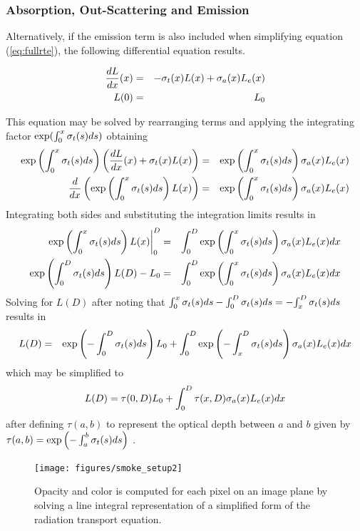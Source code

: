 %
%

\subsubsection{Absorption, Out-Scattering and Emission}
Alternatively, if the emission term is also included when
simplifying equation (\ref{eq:fullrte}),  the following
differential equation results.

\begin{eqnarray}
\label{eq:simple_rte}
\frac{dL}{dx}(x)&=&-\sigma_t(x) L(x) + \sigma_a(x) L_e(x)\\
 L(0)&=&L_0\nonumber
\end{eqnarray}

This equation may be solved by rearranging terms and applying the
integrating factor $\exp(\int_0^x \sigma_t(s) ds)$
obtaining
\begin{eqnarray*}
\exp\left({\int_0^x \sigma_t(s) ds}\right)\left(\frac{dL}{dx}(x)+\sigma_t(x) L(x)\right)&=&  \exp\left({\int_0^x \sigma_t(s) ds}\right)\sigma_a(x) L_e(x)\\
\frac{d}{dx}\left(\exp\left({\int_0^x \sigma_t(s) ds}\right) L(x)\right)&=& \exp\left({\int_0^x \sigma_t(s) ds}\right)\sigma_a(x) L_e(x)
\end{eqnarray*}
Integrating both sides and substituting the integration limits
results in
\begin{eqnarray*}
\left.\exp\left({\int_0^x \sigma_t(s) ds}\right) L(x)\right|_0^D&=& \int_0^D\exp\left({\int_0^x \sigma_t(s) ds}\right)\sigma_a(x) L_e(x) dx \\
\exp\left({\int_0^D \sigma_t(s) ds}\right) L(D)-L_0&=& \int_0^D\exp\left({\int_0^x \sigma_t(s) ds}\right)\sigma_a(x) L_e(x) dx
\end{eqnarray*}
Solving for $L(D)$ after noting that
${\int_0^x \sigma_t(s) ds}-{\int_0^D \sigma_t(s) ds}=-{\int_x^D \sigma_t(s) ds}$ results in
\begin{eqnarray*}
L(D)&=&\exp\left({-\int_0^D \sigma_t(s) ds}\right) L_0+ \int_0^D\exp\left({-\int_x^D \sigma_t(s) ds}\right)\sigma_a(x) L_e(x) dx\\
\end{eqnarray*}
which may be simplified to
\begin{equation}
 L(D)=\tau(0,D)L_0 + \int_0^D\tau(x,D)\sigma_a(x)L_e(x) dx
\end{equation}
after defining $\tau(a,b)$ to represent the optical depth between $a$ and $b$ given
by $\tau(a,b)=\exp\left({-\int_a^b \sigma_t(s) ds}\right)$ .

\begin{figure}[\figoptions]
\begin{center}
\texttt{[image: figures/smoke\_setup2]}
\end{center}
\caption {Opacity and color is computed for each pixel on an image plane by solving a line integral
representation of a simplified form of the radiation transport equation.
}
\label{figsmokesetup2}
\end{figure}


